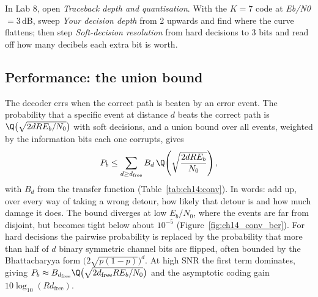 

\begin{tryit}
In Lab 8, open \emph{Traceback depth and quantisation}. With the $K=7$ code at \emph{Eb/N0}
$=3$\,dB, sweep \emph{Your decision depth} from 2 upwards and find where the curve flattens; then
step \emph{Soft-decision resolution} from hard decisions to 3 bits and read off how many decibels each
extra bit is worth.
\end{tryit}

\subsection{Performance: the union bound}

The decoder errs when the correct path is beaten by an error event. The probability that a specific
event at distance $d$ beats the correct path is $\Q\big(\sqrt{2dRE_b/N_0}\big)$ with soft decisions, and a
union bound over all events, weighted by the information bits each one corrupts, gives
\begin{equation}
P_b\le\sum_{d\ge d_{\text{free}}}B_d\,\Q\!\left(\sqrt{\frac{2dRE_b}{N_0}}\right),
\label{eq:ch14:ub}
\end{equation}
with $B_d$ from the transfer function (Table~\ref{tab:ch14:conv}). In words: add up, over every way of
taking a wrong detour, how likely that detour is and how much damage it does. The bound diverges at low
$E_b/N_0$, where the events are far from disjoint, but becomes tight below about $10^{-5}$
(Figure~\ref{fig:ch14_conv_ber}). For hard decisions the pairwise probability is replaced by the
probability that more than half of $d$ binary symmetric channel bits are flipped, often bounded by
the Bhattacharyya form $\big(2\sqrt{p(1-p)}\big)^d$. At high SNR the first term dominates, giving
$P_b\approx B_{d_{\text{free}}}\Q\big(\sqrt{2d_{\text{free}}RE_b/N_0}\big)$ and the asymptotic coding gain
$10\log_{10}(Rd_{\text{free}})$.

